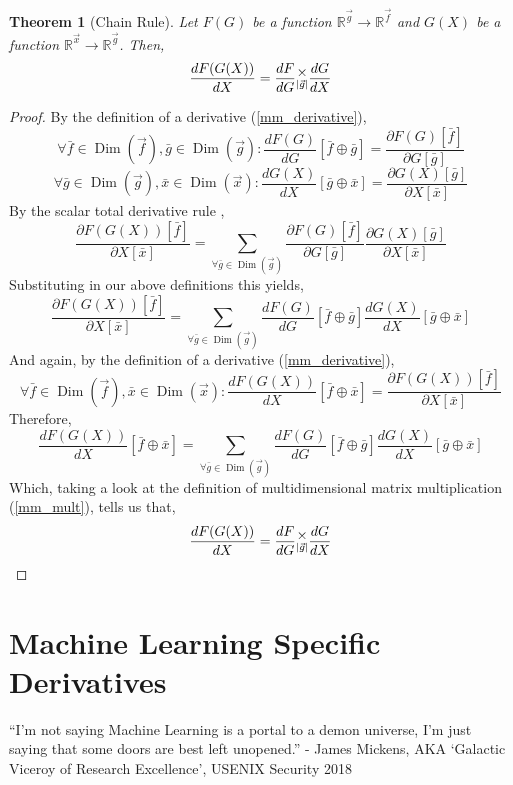 \documentclass[12pt]{book}
\theoremstyle{plain}
\newtheorem{theorem}{Theorem}[chapter]
\theoremstyle{definition}
\theoremstyle{ppart}
\theoremstyle{case}
\theoremstyle{solution}
\DeclareMathOperator{\Dim}{Dim}
\newcommand{\mmult}[1]{\text{\raisebox{1ex}{$\underset{#1}{\times}$}}}
\newcommand{\shape}[1]{\left|#1\right|}
\begin{document}
\begin{theorem}[Chain Rule]
\label{mmm_chain_rule}
Let $F(G)$ be a function $\mathbb{R}^{\vec{g}} \rightarrow \mathbb{R}^{\vec{f}}$
and $G(X)$ be a function $\mathbb{R}^{\vec{x}} \rightarrow \mathbb{R}^{\vec{g}}$.
Then,
\[
\frac{dF(G(X))}{dX} = \frac{dF}{dG} \mmult{\shape{\vec{g}}} \frac{dG}{dX}
\]
\end{theorem}
\begin{proof}
By the definition of a derivative (\ref{mm_derivative}),
\[
\forall \bar{f} \in \Dim(\vec{f}), \bar{g} \in \Dim(\vec{g}):
\frac{dF(G)}{dG}[\bar{f} \oplus \bar{g}]
= \frac{\partial F(G)[\bar{f}]}{\partial G[\bar{g}]}
\]
\[
\forall \bar{g} \in \Dim(\vec{g}), \bar{x} \in \Dim(\vec{x}):
\frac{dG(X)}{dX}[\bar{g} \oplus \bar{x}]
= \frac{\partial G(X)[\bar{g}]}{\partial X[\bar{x}]}
\]
By the scalar total derivative rule \cite{wiki:totalderiv},
\[
\frac{\partial F(G(X))[\bar{f}]}{\partial X[\bar{x}]}
= \sum_{\forall \bar{g} \in \Dim(\vec{g})} 
\frac{\partial F(G)[\bar{f}]}{\partial G[\bar{g}]}
\frac{\partial G(X)[\bar{g}]}{\partial X[\bar{x}]}
\]
Substituting in our above definitions this yields,
\[
\frac{\partial F(G(X))[\bar{f}]}{\partial X[\bar{x}]}
= \sum_{\forall \bar{g} \in \Dim(\vec{g})} 
\frac{dF(G)}{dG}[\bar{f} \oplus \bar{g}]
\frac{dG(X)}{dX}[\bar{g} \oplus \bar{x}]
\]
And again, by the definition of a derivative (\ref{mm_derivative}),
\[
\forall \bar{f} \in \Dim(\vec{f}), \bar{x} \in \Dim(\vec{x}):
\frac{dF(G(X))}{dX}[\bar{f} \oplus \bar{x}]
= \frac{\partial F(G(X))[\bar{f}]}{\partial X[\bar{x}]}
\]
Therefore,
\[
\frac{dF(G(X))}{dX}[\bar{f} \oplus \bar{x}]
= \sum_{\forall \bar{g} \in \Dim(\vec{g})} 
\frac{dF(G)}{dG}[\bar{f} \oplus \bar{g}]
\frac{dG(X)}{dX}[\bar{g} \oplus \bar{x}]
\]
Which, taking a look at the definition of multidimensional matrix multiplication
(\ref{mm_mult}), tells us that,
\[
\frac{dF(G(X))}{dX} = \frac{dF}{dG} \mmult{\shape{\vec{g}}} \frac{dG}{dX}
\]
\end{proof}

\chapter{Machine Learning Specific Derivatives}

\begin{displayquote}
``I'm not saying Machine Learning is a portal to a demon universe, I'm just saying
that some doors are best left unopened.'' - James Mickens, AKA `Galactic Viceroy of Research Excellence', USENIX Security 2018
\end{displayquote}
\end{document}
